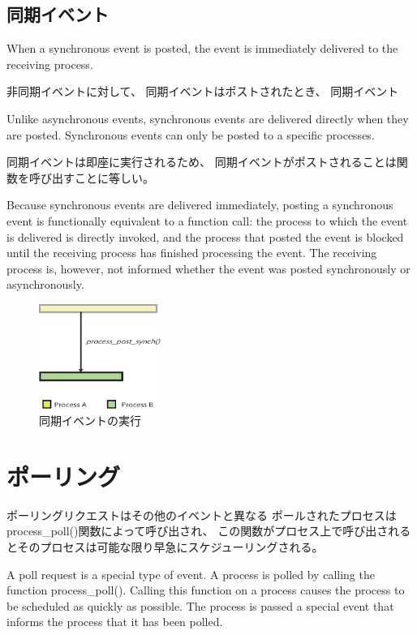 \subsection{同期イベント}
When a synchronous event is posted, the event is immediately delivered to the receiving process.

非同期イベントに対して、
同期イベントはポストされたとき、
同期イベント

Unlike asynchronous events, 
synchronous events are delivered directly when they are posted.
Synchronous events can only be posted to a specific processes.

同期イベントは即座に実行されるため、
同期イベントがポストされることは関数を呼び出すことに等しい。

Because synchronous events are delivered immediately,
posting a synchronous event is functionally equivalent to a function call: 
the process to which the event is delivered is directly invoked, 
and the process that posted the event is blocked until the receiving process has finished processing the event.
The receiving process is, however, not informed whether the event was posted synchronously or asynchronously.
\begin{figure}[htbp]
 \begin{center}
  \includegraphics[width=40mm]{./images/synchronous_event.eps}
 \end{center}
 \caption{同期イベントの実行}
 \label{fig:synchronous_event}
\end{figure}


\section{ポーリング}
ポーリングリクエストはその他のイベントと異なる
ポールされたプロセスはprocess\_poll()関数によって呼び出され、
この関数がプロセス上で呼び出されるとそのプロセスは可能な限り早急にスケジューリングされる。

A poll request is a special type of event. A process is polled by calling the function process\_poll().
Calling this function on a process causes the process to be scheduled as quickly as possible.
The process is passed a special event that informs the process that it has been polled.

